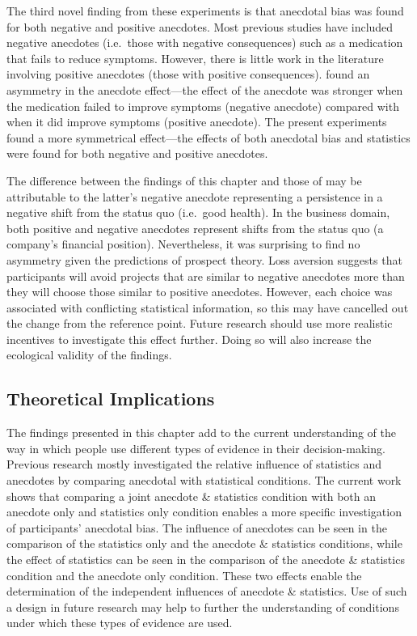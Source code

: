 \documentclass[a4paper, nobind]{templates/ociamthesis}
\theoremstyle{definition}
\theoremstyle{definition}
\theoremstyle{definition}
\theoremstyle{definition}
\theoremstyle{remark}
\begin{document}
The third novel finding from these experiments is that anecdotal bias was found
for both negative and positive anecdotes. Most previous studies have included
negative anecdotes (i.e.~those with negative consequences) such as a medication
that fails to reduce symptoms. However, there is little work in the literature
involving positive anecdotes (those with positive consequences). \textcite{jaramillo2019}
found an asymmetry in the anecdote effect---the effect of the anecdote was
stronger when the medication failed to improve symptoms (negative anecdote)
compared with when it did improve symptoms (positive anecdote). The present
experiments found a more symmetrical effect---the effects of both anecdotal bias
and statistics were found for both negative and positive anecdotes.

The difference between the findings of this chapter and those of \textcite{jaramillo2019}
may be attributable to the latter's negative anecdote representing a persistence
in a negative shift from the status quo (i.e.~good health). In the business
domain, both positive and negative anecdotes represent shifts from the status
quo (a company's financial position). Nevertheless, it was surprising to find no
asymmetry given the predictions of prospect theory. Loss aversion suggests that
participants will avoid projects that are similar to negative anecdotes more
than they will choose those similar to positive anecdotes. However, each choice
was associated with conflicting statistical information, so this may have
cancelled out the change from the reference point. Future research should use
more realistic incentives to investigate this effect further. Doing so will also
increase the ecological validity of the findings.

\subsection{Theoretical Implications}

The findings presented in this chapter add to the current understanding of the
way in which people use different types of evidence in their decision-making.
Previous research mostly investigated the relative influence of statistics and
anecdotes by comparing anecdotal with statistical conditions. The current work
shows that comparing a joint anecdote \& statistics condition with both an
anecdote only and statistics only condition enables a more specific
investigation of participants' anecdotal bias. The influence of anecdotes can be
seen in the comparison of the statistics only and the anecdote \& statistics
conditions, while the effect of statistics can be seen in the comparison of the
anecdote \& statistics condition and the anecdote only condition. These two
effects enable the determination of the independent influences of anecdote \&
statistics. Use of such a design in future research may help to further the
understanding of conditions under which these types of evidence are used.
\end{document}
